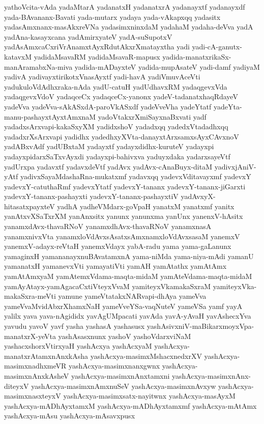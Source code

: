 {yathoVcita-vAda
yadaMtarA
yadanatxH
yadanatxrA
yadanayxtf
yadanayxdf
yada-BAvananx-Bavati
yada-mutarx
yadaya
yada-vAkapxqq
yadasitx
yadasAmxnanx-masAkxreVNa
yadasimxninxdaM
yadahaM
yadaha-deVva
yadA
yadAna-kasayxcana
yadAmirxyateV
yadA-suSupotxV
yadAsAmxcaCxriVrAnamxtAyxRdutAkxrXmatayxtha
yadi
yadi-cA-ganutx-katavxM
yadidaMsavaRM
yadidaMsavaR-mapusx
yadida-manatxrikaSx-manAramabxNa-miva
yadida-mADayxteV
yadida-mupAsateV
yadi-damf
yadiyaM
yadivA
yadivayxtirikotxVnasAyxtf
yadi-havA
yadiVmuvAceVti
yadukuloVdAdhxraka-nAda
yadU-catuH
yadUdhavxRM
yadaqgevxVda
yadaqgevxVdoV
yadaqceCx
yadaqceCx-yanonx
yadeV-tadanatxhaqRdayeV
yadeVva
yadeVva-sAkASxdA-paroVkASxdf
yadeVveVha
yadeYtatf
yadeYta-manu-pashayxtAyxtAmxnaM
yadoVtakxrXmiSayxnaBxvati
yadf
yadadxsArxvapi-kakaSxyXM
yadidxshoV
yadadxqq
yadedxVtadadhxqq
yadadxrXsArxvapi
yadidhx
yadedhxyXVta-danayxtArxsamxsAyxCAvxnoV
yadABxvAdf
yadUBxtaM
yadayxtf
yadayxdidhx-kuruteV
yadayxpi
yadayxpidarxSaTxvAyxdi
yadayxpi-bahivxva
yaduyxdaka
yadarxsayeVtf
yadUrxpa
yadavxtf
yadavxdeVtf
yadAvx
yadAvx-cAnaBuyx-ditaM
yadivxjAniV-yAtf
yadivxSayaMdashaRna-mukatxmf
yadavxqq
yadevxVditavayxmf
yadevxY
yadevxY-catuthaRmf
yadevxYtatf
yadevxY-tananx
yadevxY-tananx-jiGarxti
yadevxY-tananx-pashayxti
yadevxY-tananx-pashayxtiV
yadAvxyX-hitasatxpayxteV
yadhA
yadheVMdarx-goVpaH
yanatxM
yanatxmf
yanitx
yanAtxvXSaTxrXM
yanAnxsitx
yanunx
yanunxma
yanUnx
yanenxV-hAsitx
yanamxdAvx-thavaRNoV
yanamxdhAvx-thavaRNoV
yanamxnasA
yanamxnivxVta
yanamxloVdAvxsAsatxsAmxnamxloVdAvxsasaM
yanemxV
yanemxV-adayx-reVtaH
yanemxVdayx
yabA-radu
yama
yama-gaLanunx
yamaginxH
yamananayxnuBAvatamxnA
yama-niMda
yama-niya-mAdi
yamanU
yamanatxH
yamanevxVti
yamayatiVti
yamAH
yamAtathx
yamAtAmx
yamAtAmxyaM
yamAtemxVdama-maqta-midaM
yamAteVdama-maqta-midaM
yamAyAtayx-yamAgacaCxtiVteyxVvaM
yamiteyxVkamakaSxraM
yamiteyxVka-makaSxra-meVti
yamune
yameVtatakxNARvapi-dhAya
yameVva
yameVvaMvidAbxrXhamxNaH
yameVveYSa-vaqNuteV
yameVSa
yamf
yayA
yalilx
yava
yava-nAgididx
yavAgUMpacati
yavAda
yavA-yAvaH
yavAshecxYva
yavudu
yavoV
yavf
yasha
yashasA
yashasusx
yashAsivxniV-maBikarxmoyxVpa-manatxrX-yeVta
yashAsasxnunx
yashoV
yashoVdarxviNaM
yashacxshorxVtirxyaH
yashAcxya
yashAcxyaM
yashAcxya-manatxrAtamxnAnxkAsha
yashAcxya-masimxMshacxnedxrXV
yashAcxya-masimxnadhxmeVR
yashAcxya-masimxnanxgwnx
yashAcxya-masimxnAnxkAsheV
yashAcxya-masimxnAnxtamxni
yashAcxya-masimxnAnx-diteyxV
yashAcxya-masimxnAmxnuSeV
yashAcxya-masimxnAvxyw
yashAcxya-masimxnasxteyxV
yashAcxya-masimxsatx-nayitwnx
yashAcxya-masAyxM
yashAcxya-mADhAyxtamxM
yashAcxya-mADhAyxtamxmf
yashAcxya-mAtAmx
yashAcxya-mAsu
yashAcxya-mAsavxpusx
}

